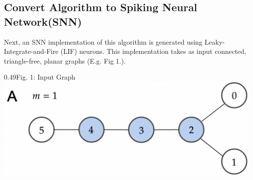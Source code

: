 \subsection{Convert Algorithm to Spiking Neural Network(SNN)}\label{subsec:algo_to_snn}
\vspace{-1.5em}
Next, an SNN implementation of this algorithm is generated using Leaky-Integrate-and-Fire (LIF) neurons. This implementation takes as input connected, triangle-free, planar graphs (E.g. Fig 1.). 
\hspace{-3em}
\begin{rudifig}{0.49\hsize}{Fig. 1: Input Graph}
    \hspace{-1.5em}
    \includegraphics[width=1.1\linewidth]{latex/Images/input_graph_G_6_0_alternative1.png}
    \label{fig:input_graph}
\end{rudifig}

